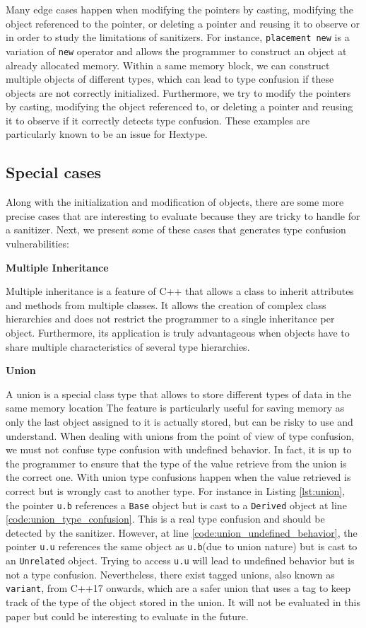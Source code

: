 \documentclass[a4paper,11pt,oneside]{report}
\begin{document}
\noindent{}Many edge cases happen when modifying the pointers by casting,
modifying the object referenced to the pointer, or deleting a pointer and
reusing it to observe or in order to study the limitations of sanitizers. For
instance, \texttt{placement new} is a variation of \texttt{new} operator and 
allows the programmer to construct an
object at already allocated memory.  Within a same memory block, we can
construct multiple objects of different types, which can lead to type confusion
if these objects are not correctly initialized. Furthermore, we try to modify the
pointers by casting, modifying the object referenced to, or deleting a pointer
and reusing it to observe if it correctly detects type confusion. These examples
are particularly known to be an issue for Hextype.
\subsection{Special cases}

Along with the initialization and modification of objects, there are some 
more precise cases that are interesting to evaluate because they are 
tricky to handle for a sanitizer. Next, we present some of these cases that 
generates type confusion vulnerabilities:

\textbf{Multiple Inheritance}

\noindent{}Multiple inheritance is a feature of C++ that allows a class to
inherit attributes and methods from multiple classes. It allows the creation of
complex class hierarchies and does not restrict the programmer to a single
inheritance per object. Furthermore, its application is truly advantageous when
objects have to share multiple characteristics of several type hierarchies. 

\textbf{Union}

\noindent{}A union is a special class type that allows to store different types
of data in the same memory location The feature is particularly useful for
saving memory as only the last object assigned to it is actually stored, but can
be risky to use and understand. When dealing with unions from the point of
view of type confusion, we must not confuse type confusion with undefined
behavior. In fact, it is up to the programmer to ensure that
the type of the value retrieve from the union is the correct one. With union type
confusions happen when the value retrieved is correct but is wrongly cast to
another type. For instance in Listing \autoref{lst:union}, the pointer
\texttt{u.b} references a \texttt{Base} object but is cast to a \texttt{Derived}
object at line \ref{code:union_type_confusion}.  This is a real type confusion and
should be detected by the sanitizer. However, at line
\ref{code:union_undefined_behavior}, the pointer \texttt{u.u} references the
same object as \texttt{u.b}(due to union nature) but is cast to an
\texttt{Unrelated} object.  Trying to access \texttt{u.u} will lead to undefined
behavior but is not a type confusion. Nevertheless, there exist tagged unions,
also known as \texttt{variant}, from C++17 onwards, which are a safer union that
uses a tag to keep track of the type of the object stored in the union. It will
not be evaluated in this paper but could be interesting to evaluate in the future.
\end{document}
